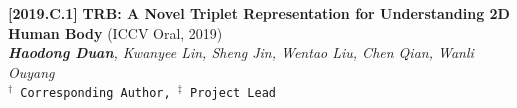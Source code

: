 \documentclass{resume}
\newcommand{\itemgap}{\vspace{-1mm}}%
\begin{document}
\itemgap

\textbf{[2019.C.1]} \textbf{TRB: A Novel Triplet Representation for Understanding 2D Human Body} (ICCV Oral, 2019)  \\
\textit{\textbf{Haodong Duan}, Kwanyee Lin, Sheng Jin, Wentao Liu, Chen Qian,  Wanli Ouyang} \\

\texttt{$^\dag$ Corresponding Author,  $^\ddag$ Project Lead}

\end{document}

